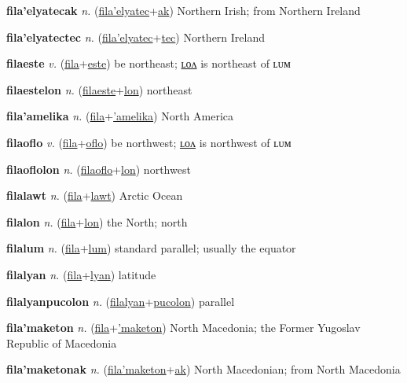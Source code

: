 \textbf{\hypertarget{fila'elyatecak}{fila'elyatecak}} \textit{n.} (\hyperlink{fila'elyatec}{fila'elyatec}+\allowbreak \hyperlink{ak}{ak})
Northern Irish; from Northern Ireland

\textbf{\hypertarget{fila'elyatectec}{fila'elyatectec}} \textit{n.} (\hyperlink{fila'elyatec}{fila'elyatec}+\allowbreak \hyperlink{tec}{tec})
Northern Ireland

\textbf{\hypertarget{filaeste}{filaeste}} \textit{v.} (\hyperlink{fila}{fila}+\allowbreak \hyperlink{este}{este})
be northeast; \hyperlink{filaestelon}{ʟᴏᴧ} is northeast of ʟᴜᴍ

\textbf{\hypertarget{filaestelon}{filaestelon}} \textit{n.} (\hyperlink{filaeste}{filaeste}+\allowbreak \hyperlink{lon}{lon})
northeast

\textbf{\hypertarget{fila'amelika}{fila'amelika}} \textit{n.} (\hyperlink{fila}{fila}+\allowbreak \hyperlink{'amelika}{'amelika})
North America

\textbf{\hypertarget{filaoflo}{filaoflo}} \textit{v.} (\hyperlink{fila}{fila}+\allowbreak \hyperlink{oflo}{oflo})
be northwest; \hyperlink{filaoflolon}{ʟᴏᴧ} is northwest of ʟᴜᴍ

\textbf{\hypertarget{filaoflolon}{filaoflolon}} \textit{n.} (\hyperlink{filaoflo}{filaoflo}+\allowbreak \hyperlink{lon}{lon})
northwest

\textbf{\hypertarget{filalawt}{filalawt}} \textit{n.} (\hyperlink{fila}{fila}+\allowbreak \hyperlink{lawt}{lawt})
Arctic Ocean

\textbf{\hypertarget{filalon}{filalon}} \textit{n.} (\hyperlink{fila}{fila}+\allowbreak \hyperlink{lon}{lon})
the North; north

\textbf{\hypertarget{filalum}{filalum}} \textit{n.} (\hyperlink{fila}{fila}+\allowbreak \hyperlink{lum}{lum})
standard parallel; usually the equator

\textbf{\hypertarget{filalyan}{filalyan}} \textit{n.} (\hyperlink{fila}{fila}+\allowbreak \hyperlink{lyan}{lyan})
latitude

\textbf{\hypertarget{filalyanpucolon}{filalyanpucolon}} \textit{n.} (\hyperlink{filalyan}{filalyan}+\allowbreak \hyperlink{pucolon}{pucolon})
parallel

\textbf{\hypertarget{fila'maketon}{fila'maketon}} \textit{n.} (\hyperlink{fila}{fila}+\allowbreak \hyperlink{'maketon}{'maketon})
North Macedonia; the Former Yugoslav Republic of Macedonia

\textbf{\hypertarget{fila'maketonak}{fila'maketonak}} \textit{n.} (\hyperlink{fila'maketon}{fila'maketon}+\allowbreak \hyperlink{ak}{ak})
North Macedonian; from North Macedonia

